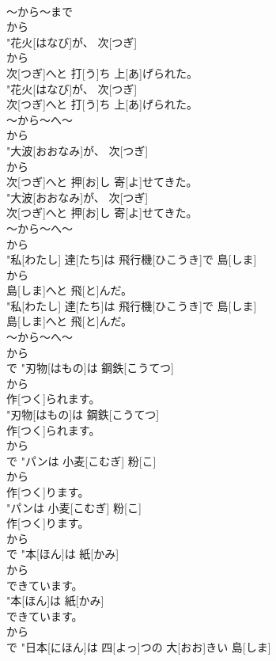 \documentclass[8pt]{extreport}
\begin{document}
\begin{CJK}{UTF8}{min}
\\	～から～まで 
\\	から
\\	"花火[はなび]が、 次[つぎ]
\\	から
\\	次[つぎ]へと 打[う]ち 上[あ]げられた。
\\	"花火[はなび]が、 次[つぎ]
\\	次[つぎ]へと 打[う]ち 上[あ]げられた。
\\	～から～へ～ 
\\	から
\\	"大波[おおなみ]が、 次[つぎ]
\\	から
\\	次[つぎ]へと 押[お]し 寄[よ]せてきた。
\\	"大波[おおなみ]が、 次[つぎ]
\\	次[つぎ]へと 押[お]し 寄[よ]せてきた。
\\	～から～へ～ 
\\	から
\\	"私[わたし] 達[たち]は 飛行機[ひこうき]で 島[しま]
\\	から
\\	島[しま]へと 飛[と]んだ。
\\	"私[わたし] 達[たち]は 飛行機[ひこうき]で 島[しま]
\\	島[しま]へと 飛[と]んだ。
\\	～から～へ～ 
\\	から
\\	で	"刃物[はもの]は 鋼鉄[こうてつ]
\\	から
\\	作[つく]られます。
\\	"刃物[はもの]は 鋼鉄[こうてつ]
\\	作[つく]られます。
\\	から
\\	で	"パンは 小麦[こむぎ] 粉[こ]
\\	から
\\	作[つく]ります。
\\	"パンは 小麦[こむぎ] 粉[こ]
\\	作[つく]ります。
\\	から
\\	で	"本[ほん]は 紙[かみ]
\\	から
\\	できています。
\\	"本[ほん]は 紙[かみ]
\\	できています。
\\	から
\\	で	"日本[にほん]は 四[よっ]つの 大[おお]きい 島[しま]

\end{CJK}
\end{document}
